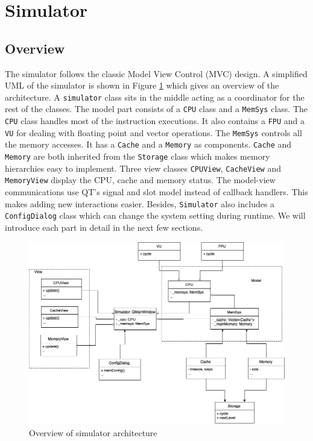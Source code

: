 \documentclass{sig-alternate}
\begin{document}
\section{Simulator}
\subsection{Overview}
The simulator follows the classic Model View Control (MVC) design. A simplified UML of the simulator is shown in Figure \ref{fig:uml} which gives an overview of the architecture. A \texttt{simulator} class sits in the middle acting as a coordinator for the rest of the classes. The model part consists of a \texttt{CPU} class and a \texttt{MemSys} class. The \texttt{CPU} class handles most of the instruction executions. It also contains a \texttt{FPU} and a \texttt{VU} for dealing with floating point and vector operations. The \texttt{MemSys} controls all the memory accesses. It has a \texttt{Cache} and a \texttt{Memory} as components. \texttt{Cache} and \texttt{Memory} are both inherited from the \texttt{Storage} class which makes memory hierarchies easy to implement. Three view classes \texttt{CPUView}, \texttt{CacheView} and \texttt{MemoryView} display the CPU, cache and memory status. The model-view communications use QT's signal and slot model instead of callback handlers. This makes adding new interactions easier. Besides, \texttt{Simulator} also includes a \texttt{ConfigDialog} class which can change the system setting during runtime. We will introduce each part in detail in the next few sections. 

\begin{figure}[!ht]
\centering
\includegraphics[width = 0.7\linewidth,keepaspectratio]{uml_simulator}
\caption{Overview of simulator architecture}
\label{fig:uml}
\end{figure}
\end{document}
